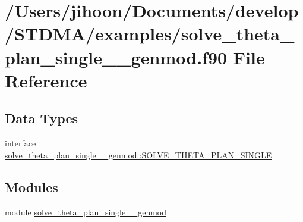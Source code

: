 \hypertarget{solve__theta__plan__single____genmod_8f90}{}\section{/\+Users/jihoon/\+Documents/develop/\+S\+T\+D\+M\+A/examples/solve\+\_\+theta\+\_\+plan\+\_\+single\+\_\+\+\_\+genmod.f90 File Reference}
\label{solve__theta__plan__single____genmod_8f90}
\subsection*{Data Types}
\begin{DoxyCompactItemize}
\item 
interface \mbox{\hyperlink{interfacesolve__theta__plan__single____genmod_1_1_s_o_l_v_e___t_h_e_t_a___p_l_a_n___s_i_n_g_l_e}{solve\+\_\+theta\+\_\+plan\+\_\+single\+\_\+\+\_\+genmod\+::\+S\+O\+L\+V\+E\+\_\+\+T\+H\+E\+T\+A\+\_\+\+P\+L\+A\+N\+\_\+\+S\+I\+N\+G\+LE}}
\end{DoxyCompactItemize}
\subsection*{Modules}
\begin{DoxyCompactItemize}
\item 
module \mbox{\hyperlink{namespacesolve__theta__plan__single____genmod}{solve\+\_\+theta\+\_\+plan\+\_\+single\+\_\+\+\_\+genmod}}
\end{DoxyCompactItemize}
